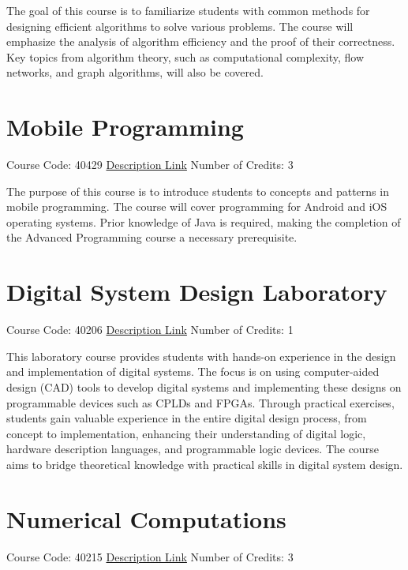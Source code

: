 \documentclass[
fontsize=11pt,
paper=a4,
parskip=half,
enlargefirstpage=off,    %
fromalign=right,        %
fromphone=on,           %
fromemail=on,
fromrule=off,           %
addrfield=off,          %
backaddress=on,         %
subject=beforeopening,  %
locfield=narrow,        %
foldmarks=off,          %
open=any
]{scrartcl}
\begin{document}
The goal of this course is to familiarize students with common methods for designing efficient algorithms to solve various problems. The course will emphasize the analysis of algorithm efficiency and the proof of their correctness. Key topics from algorithm theory, such as computational complexity, flow networks, and graph algorithms, will also be covered.

\section{Mobile Programming}
Course Code: 40429 \qquad \quad \href{https://docs.ce.sharif.edu/course/40429}{Description Link}
\qquad \quad Number of Credits: 3

The purpose of this course is to introduce students to concepts and patterns in mobile programming. The course will cover programming for Android and iOS operating systems. Prior knowledge of Java is required, making the completion of the Advanced Programming course a necessary prerequisite.

\section{Digital System Design Laboratory}
Course Code: 40206 \qquad \quad \href{https://docs.ce.sharif.edu/course/40206}{Description Link}
\qquad \quad Number of Credits: 1

This laboratory course provides students with hands-on experience in the design and implementation of digital systems. The focus is on using computer-aided design (CAD) tools to develop digital systems and implementing these designs on programmable devices such as CPLDs and FPGAs. Through practical exercises, students gain valuable experience in the entire digital design process, from concept to implementation, enhancing their understanding of digital logic, hardware description languages, and programmable logic devices. The course aims to bridge theoretical knowledge with practical skills in digital system design.


\section{Numerical Computations}
Course Code: 40215 \qquad \quad \href{https://docs.ce.sharif.edu/course/40215}{Description Link}
\qquad \quad Number of Credits: 3
\end{document}
